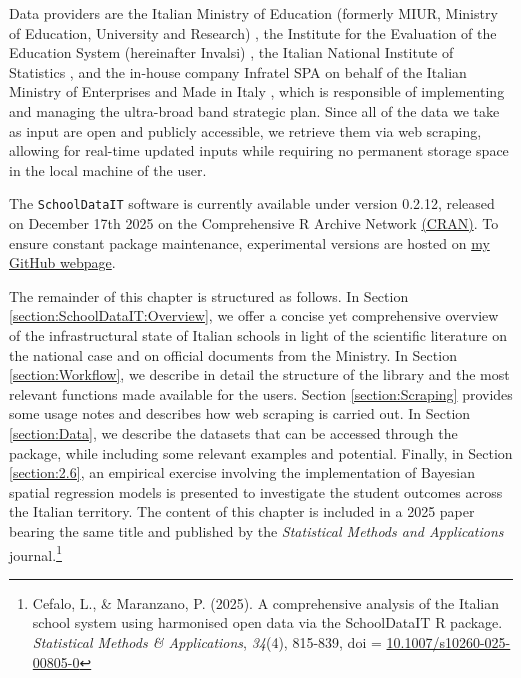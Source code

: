 \documentclass[openany, 11pt, oneside]{book}
\begin{document}
Data providers are the Italian Ministry of Education (formerly MIUR, Ministry of Education, University and Research) \parencite{MIUR}, the Institute for the Evaluation of the Education System (hereinafter Invalsi) \parencite{Invalsi_IS}, the Italian National Institute of Statistics \parencite[ISTAT,][]{InnerAreas, Situas, Shapefiles}, and the in-house company Infratel SPA on behalf of the Italian Ministry of Enterprises and Made in Italy \parencite[MIMIT,][]{BB}, which is responsible of implementing and managing the ultra-broad band strategic plan. Since all of the data we take as input are open and publicly accessible, we retrieve them via web scraping, allowing for real-time updated inputs while requiring no permanent storage space in the local machine of the user.

The \texttt{SchoolDataIT} software is currently available under version 0.2.12, released on December 17th 2025 on the Comprehensive R Archive Network \href{https://cran.r-project.org/web/packages/SchoolDataIT/index.html}{(CRAN)}. To ensure constant package maintenance, experimental versions are hosted on \href{https://github.com/lcef97/SchoolDataIT}{my GitHub webpage}.

The remainder of this chapter is structured as follows. In Section \ref{section:SchoolDataIT:Overview}, we offer a concise yet comprehensive overview of the infrastructural state of Italian schools in light of the scientific literature on the national case and on official documents from the Ministry. In Section \ref{section:Workflow}, we describe in detail the structure of the library and the most relevant functions made available for the users. Section \ref{section:Scraping} provides some usage notes and describes how web scraping is carried out. In Section \ref{section:Data}, we describe the datasets that can be accessed through the package, while including some relevant examples and potential. Finally, in Section \ref{section:2.6}, an empirical exercise involving the implementation of Bayesian spatial regression models is presented to investigate the student outcomes across the Italian territory. The content of this chapter is included in a 2025 paper bearing the same title and published by the \textit{Statistical Methods and Applications} journal.\footnote{Cefalo, L., \& Maranzano, P. (2025). A comprehensive analysis of the Italian school system using harmonised open data via the SchoolDataIT R package. \textit{Statistical Methods \& Applications}, \textit{34}(4), 815-839, doi = \href{https://link.springer.com/article/10.1007/s10260-025-00805-0}{10.1007/s10260-025-00805-0} }
\end{document}

